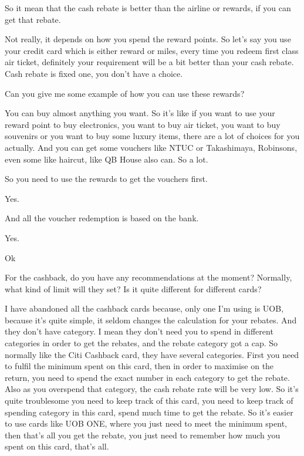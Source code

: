\begin{description}[leftmargin=4em,style=nextline]
	\item[JH:] So it mean that the cash rebate is better than the airline or rewards, if you can get that rebate.

	\item[HJ:] Not really, it depends on how you spend the reward points. So let’s say you use your credit card which is either reward or miles, every time you redeem first class air ticket, definitely your requirement will be a bit better than your cash rebate. Cash rebate is fixed one, you don’t have a choice.

	\item[JH:] Can you give me some example of how you can use these rewards?

	\item[HJ:] You can buy almost anything you want. So it’s like if you want to use your reward point to buy electronics, you want to buy air ticket, you want to buy souvenirs or you want to buy some luxury items, there are a lot of choices for you actually. And you can get some vouchers like NTUC or Takashimaya, Robinsons, even some like haircut, like QB House also can. So a lot.

	\item[JH:] So you need to use the rewards to get the vouchers first.

	\item[HJ:] Yes.

	\item[JH:] And all the voucher redemption is based on the bank.

	\item[HJ:] Yes.

	\item[JH:] Ok

	\item[JH:] For the cashback, do you have any recommendations at the moment? Normally, what kind of limit will they set? Is it quite different for different cards?

	\item[HJ:] I have abandoned all the cashback cards because, only one I’m using is UOB, because it’s quite simple, it seldom changes the calculation for your rebates. And they don’t have category. I mean they don’t need you to spend in different categories in order to get the rebates, and the rebate category got a cap. So normally like the Citi Cashback card, they have several categories. First you need to fulfil the minimum spent on this card, then in order to maximise on the return, you need to spend the exact number in each category to get the rebate. Also as you overspend that category, the cash rebate rate will be very low. So it’s quite troublesome you need to keep track of this card, you need to keep track of spending category in this card, spend much time to get the rebate. So it’s easier to use cards like UOB ONE, where you just need to meet the minimum spent, then that’s all you get the rebate, you just need to remember how much you spent on this card, that’s all.


\end{description}
